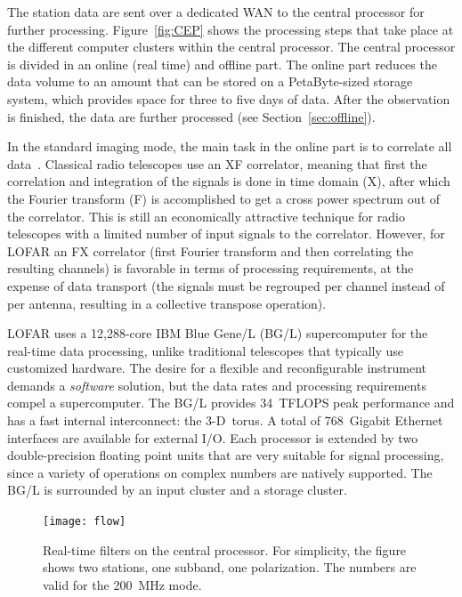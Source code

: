 \documentclass[journal]{IEEEtran}
\begin{document}
The station data are sent over a dedicated WAN to the central processor for
further processing.
Figure~\ref{fig:CEP} shows the processing steps that take place at the
different computer clusters within the central processor.
The central processor is divided in an online (real time) and offline part.
The online part reduces the data volume to an amount that can be stored on
a PetaByte-sized storage system, which provides space for three to five days
of data.
After the observation is finished, the data are further processed (see
Section~\ref{sec:offline}).

In the standard imaging mode, the main task in the online part is to
correlate all data~\cite{Romein:06}.
Classical radio telescopes use an XF correlator, meaning that first the
correlation and integration of the signals is done in time domain (X),
after which the Fourier transform (F) is accomplished to get a cross power
spectrum out of the correlator.
This is still an economically attractive technique for radio telescopes with
a limited number of input signals to the correlator.
However, for LOFAR an FX correlator (first Fourier transform and then
correlating the resulting channels) is favorable in terms of processing
requirements, at the expense of data transport (the signals must be regrouped
per channel instead of per antenna, resulting in a collective transpose
operation).

LOFAR uses a 12,288-core IBM Blue Gene/L (BG/L) supercomputer for the real-time
data processing,
unlike traditional telescopes that typically use customized hardware.
The desire for a flexible and reconfigurable instrument demands a
{\em software\/} solution, but the data rates and processing requirements
compel a supercomputer.
The BG/L provides 34~TFLOPS peak performance and has a fast internal
interconnect: the 3-D~torus.
A total of 768~Gigabit Ethernet interfaces are available for external I/O.
Each processor is extended by two double-precision floating point units
that are very suitable for signal processing, since a variety of operations
on complex numbers are natively supported.
The BG/L is surrounded by an input cluster and a storage cluster.


\begin{figure}
\texttt{[image: flow]}
\caption{Real-time filters on the central processor.  For simplicity, the
figure shows two stations, one subband, one polarization.  The numbers are
valid for the 200~MHz mode.}
\label{fig:flow}
\end{figure}
\end{document}
